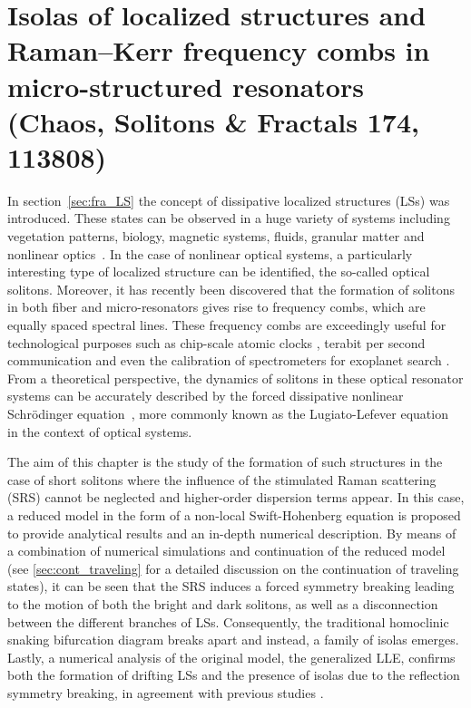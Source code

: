 \chapter{Isolas of localized structures and Raman–Kerr frequency combs in micro-structured resonators (Chaos, Solitons \& Fractals 174, 113808)}

\label{ch:isolas}

In section~\ref{sec:fra_LS} the concept of dissipative 
localized structures (LSs) was introduced. These states can be observed in a huge variety
of systems including vegetation patterns, biology, magnetic systems, fluids,
granular matter and nonlinear 
optics~\cite{tlidi2014localized,heimburg2005soliton,descalzi2011localized,purwins2010dissipative,ankiewicz2008dissipative,knobloch2015spatial}. 
In the case of nonlinear optical systems,
a particularly interesting type of localized structure can be identified,
the so-called optical solitons. Moreover, it has recently been discovered that the formation of solitons
in both fiber and micro-resonators gives rise to frequency combs, which are equally
spaced spectral lines. These frequency combs are exceedingly useful
for technological purposes such as chip-scale atomic clocks \cite{Jost2015clock}, terabit
per second communication \cite{marin2017microresonator} and even the calibration of spectrometers
for exoplanet search \cite{suh2019searching}. From a theoretical perspective, the dynamics
of solitons in these optical resonator systems can be accurately described 
by the forced dissipative nonlinear Schrödinger
equation~\cite{morales1974ponderomotive,nozaki1984solitons,kaup1978theory,ferre2017localized},
more commonly known as the Lugiato-Lefever equation~\cite{lugiatolefever1987} in the context
of optical systems.

The aim of this chapter is the study of the formation of such structures in the
case of short solitons where the influence of the stimulated Raman scattering (SRS)
cannot be neglected and higher-order dispersion terms appear. In this case, a reduced model
in the form of a non-local Swift-Hohenberg equation is proposed to provide 
analytical results and an in-depth numerical description. By means of a combination of
numerical simulations and
continuation of the reduced model (see \ref{sec:cont_traveling} for a detailed discussion on the
continuation of traveling states), it can be seen that the SRS induces a forced symmetry
breaking leading to the motion of both the bright and dark solitons, as well as a disconnection between 
the different branches of LSs. Consequently, the traditional homoclinic snaking bifurcation diagram breaks
apart and instead, a family of isolas emerges. Lastly, a numerical analysis of the
original model, the generalized LLE, confirms both the formation of drifting LSs and
the presence of isolas due to the reflection symmetry breaking, in agreement with previous studies \cite{burke2009swift,parra2014third}.

